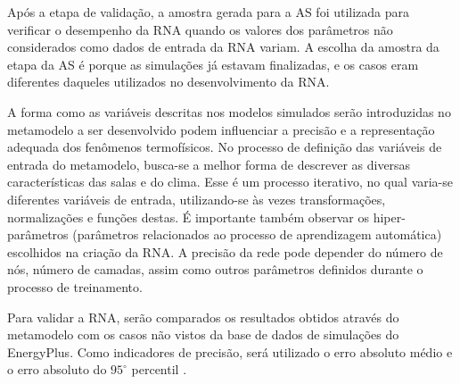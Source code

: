 \documentclass[brazil,hardcopy,openany,a5paper]{ufscthesis}
\begin{document}
		Após a etapa de validação, a amostra gerada para a AS foi utilizada para verificar o desempenho da RNA quando os valores dos parâmetros não considerados como dados de entrada da RNA variam. A escolha da amostra da etapa da AS é porque as simulações já estavam finalizadas, e os casos eram diferentes daqueles utilizados no desenvolvimento da RNA. 
		
		A forma como as variáveis descritas nos modelos simulados serão introduzidas no metamodelo a ser desenvolvido podem influenciar a precisão e a representação adequada dos fenômenos termofísicos. No processo de definição das variáveis de entrada do metamodelo, busca-se a melhor forma de descrever as diversas características das salas e do clima. Esse é um processo iterativo, no qual varia-se diferentes variáveis de entrada, utilizando-se às vezes transformações, normalizações e funções destas. É importante também observar os hiper-parâmetros (parâmetros relacionados ao processo de aprendizagem automática) escolhidos na criação da RNA. A precisão da rede pode depender do número de nós, número de camadas, assim como outros parâmetros definidos durante o processo de treinamento.
		
		Para validar a RNA, serão comparados os resultados obtidos através do metamodelo com os casos não vistos da base de dados de simulações do EnergyPlus. Como indicadores de precisão, será utilizado o erro absoluto médio e o erro absoluto do $95^{\circ}$ percentil .
		

%
%

	
\end{document}
